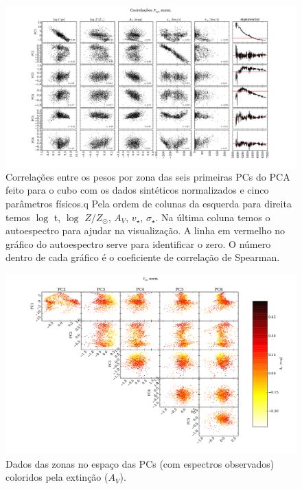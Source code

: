 \begin{figure}
    \includegraphics[width=1.3\textwidth, angle=-90]{figuras/K0277-correl-f_syn_norm-PCvsPhys.pdf}
	\caption[Correlações PCs vs. par\^ametros f\'isicos - $F_{syn}$ norm.]
    {Correlações entre os pesos por zona das seis primeiras PCs do PCA feito para o cubo com os dados sintéticos
    normalizados e cinco parâmetros físicos.q Pela ordem de colunas da esquerda para direita temos $\log$ t, $\log$ $Z /
    Z_{\odot}$, $A_V$, $v_{\star}$, $\sigma_{\star}$. Na última coluna temos o autoespectro para ajudar na visualização.
    A linha em vermelho no gráfico do autoespectro serve para identificar o zero. O número dentro de cada gráfico é o
    coeficiente de correlação de Spearman.}
    \label{fig:PCAaplic:K0277correfsynorm}
\end{figure}

\begin{figure}
	\includegraphics[width=1.4\textwidth, angle=-90]{figuras/K0277-f_obs_norm-corre_PCxPC_AV.pdf}
	\caption[Dados no espaço das PCs vs AV- $F_{obs}$ norm.]
    {Dados das zonas no espaço das PCs (com espectros observados) coloridos pela extinção ($A_V$).}
    \label{fig:PCAaplic:K0277correfobsnormPCvsPC:AV}	
\end{figure}

